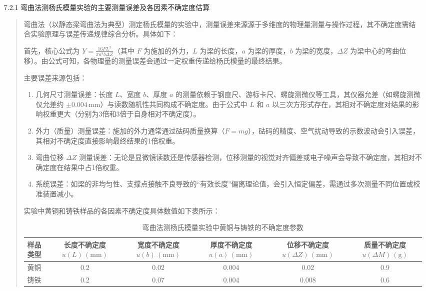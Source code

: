 \documentclass[11pt]{article}
\begin{document}
\begin{enumerate}
    \item[7.2.1] 弯曲法测杨氏模量实验的主要测量误差及各因素不确定度估算
    \begin{quote}
    弯曲法（以静态梁弯曲法为典型）测定杨氏模量的实验中，测量误差来源源于多维度的物理量测量与操作过程，其不确定度需结合实验原理与误差传递规律综合分析。具体如下：

    首先，核心公式为 \( Y = \frac{16FL^3}{\pi a^3 b \Delta Z} \)（其中 \( F \) 为施加的外力，\( L \) 为梁的长度，\( a \) 为梁的厚度，\( b \) 为梁的宽度，\( \Delta Z \) 为梁中心的弯曲位移）。由公式可知，各物理量的测量误差会通过一定权重传递给杨氏模量的最终结果。

    主要误差来源包括：
    \begin{enumerate}
        \item 几何尺寸测量误差：长度 \( L \)、宽度 \( b \)、厚度 \( a \) 的测量依赖于钢直尺、游标卡尺、螺旋测微仪等工具，其仪器允差（如螺旋测微仪允差约 \( \pm 0.004 \, \text{mm} \)）与读数随机性共同构成不确定度。由于公式中 \( L \) 和 \( a \) 以三次方形式存在，其相对不确定度对结果的影响权重更大（分别为3倍和3倍于自身相对不确定度）。
        \item 外力（质量）测量误差：施加的外力通常通过砝码质量换算（\( F = mg \)），砝码的精度、空气扰动导致的示数波动会引入误差，其相对不确定度直接影响最终结果的1倍权重。
        \item 弯曲位移 \( \Delta Z \) 测量误差：无论是显微镜读数还是传感器检测，位移测量的视觉对齐偏差或电子噪声会导致不确定度，其相对不确定度在结果中占1倍权重。
        \item 系统误差：如梁的非均匀性、支撑点接触不良导致的“有效长度”偏离理论值，会引入恒定偏差，需通过多次测量不同位置或校准装置减小。
    \end{enumerate}

    实验中黄铜和铸铁样品的各因素不确定度具体数值如下表所示：
    \begin{table}[h]
    \centering
    \caption{弯曲法测杨氏模量实验中黄铜与铸铁的不确定度参数}
    \begin{tabular}{lccccc}
    \toprule
    样品类型 & 长度不确定度 \( u(L) \, (\text{mm}) \) & 宽度不确定度 \( u(b) \, (\text{mm}) \) & 厚度不确定度 \( u(a) \, (\text{mm}) \) & 位移不确定度 \( u(\Delta Z) \, (\text{mm}) \) & 质量不确定度 \( u(\Delta M) \, (\text{g}) \) \\
    \midrule
    黄铜     & 0.2                     & 0.02                    & 0.004                   & 0.02                         & 0.9                          \\
    铸铁     & 0.2                     & 0.07                    & 0.004                   & 0.008                        & 0.6                          \\
    \bottomrule
    \end{tabular}
    \end{table}


\end{quote}
\end{enumerate}
\end{document}
